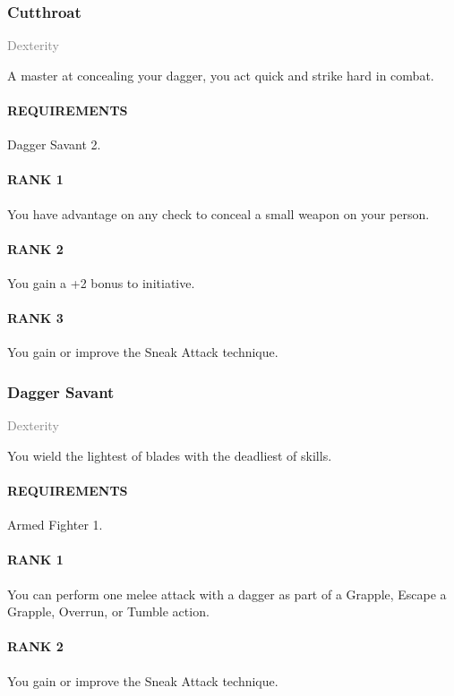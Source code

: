 \subsubsection{Cutthroat} \label{feat::cutthroat}
\small{\textcolor{gray}{Dexterity}}

\normalsize
A master at concealing your dagger, you act quick and strike hard in combat.
\paragraph{REQUIREMENTS} Dagger Savant 2.
\paragraph{RANK 1} You have advantage on any check to conceal a small weapon on your person.
\paragraph{RANK 2} You gain a +2 bonus to initiative. %
\paragraph{RANK 3} You gain or improve the Sneak Attack technique.

\subsubsection{Dagger Savant} \label{feat::daggersavant}
\small{\textcolor{gray}{Dexterity}}

\normalsize
You wield the lightest of blades with the deadliest of skills.
\paragraph{REQUIREMENTS} Armed Fighter 1.
\paragraph{RANK 1} You can perform one melee attack with a dagger as part of a Grapple, Escape a Grapple, Overrun, or Tumble action.
\paragraph{RANK 2} You gain or improve the Sneak Attack technique.
